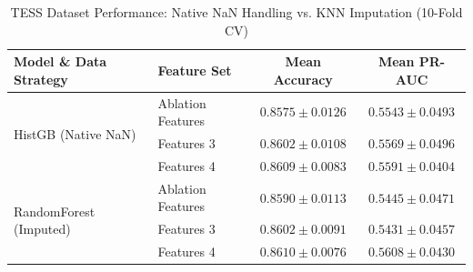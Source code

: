 \documentclass{article}
\begin{document}
\begin{table}[h]
\centering
\caption{TESS Dataset Performance: Native NaN Handling vs. KNN Imputation (10-Fold CV)}
\label{tab:tess_missing_data}
\begin{tabular}{llcc}
\toprule
\textbf{Model \& Data Strategy} & \textbf{Feature Set} & \textbf{Mean Accuracy} & \textbf{Mean PR-AUC} \\
\midrule
\multirow{3}{*}{HistGB (Native NaN)}
& Ablation Features & $0.8575 \pm 0.0126$ & $0.5543 \pm 0.0493$ \\
& Features 3 & $0.8602 \pm 0.0108$ & $0.5569 \pm 0.0496$ \\
& Features 4 & $0.8609 \pm 0.0083$ & $0.5591 \pm 0.0404$ \\
\midrule
\multirow{3}{*}{RandomForest (Imputed)}
& Ablation Features & $0.8590 \pm 0.0113$ & $0.5445 \pm 0.0471$ \\
& Features 3 & $0.8602 \pm 0.0091$ & $0.5431 \pm 0.0457$ \\
& Features 4 & $0.8610 \pm 0.0076$ & $0.5608 \pm 0.0430$ \\
\bottomrule
\end{tabular}
\end{table}

\end{document}
